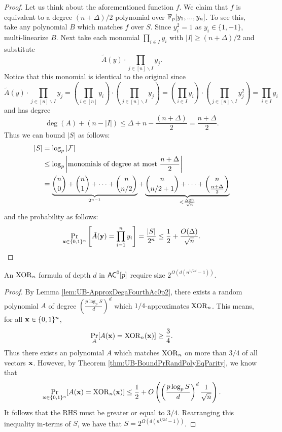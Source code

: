 \documentclass[11pt]{article}
\begin{document}
\begin{proof}
		Let us think about the aforementioned function $f$. We claim that $f$ is equivalent to a degree $(n + \Delta)/2$ polynomial over $\mathbb{F}_p[y_1, ..., y_n]$. To see this, take any polynomial $B$ which matches $f$ over $S$. Since $y_i^2 = 1$ as $y_i \in \{1, -1\}$, multi-linearize $B$. Next take each monomial $\prod_{i \in I}y_i$ with $|I| \geq (n + \Delta)/2$ and substitute 
		\[\tilde{A}(y) \cdot \prod_{j \in [n]\backslash I}y_j.\]
		Notice that this monomial is identical to the original since
		\[\tilde{A}(y) \cdot \prod_{j \in [n]\backslash I}y_j = \left(\prod_{i \in [n]} y_i\right) \cdot \left(\prod_{j \in [n]\backslash I}y_j\right) = \left(\prod_{i \in I}y_i\right)\cdot \left(\prod_{j \in [n]\backslash I}y_j^2\right) = \prod_{i \in I}y_i\]
		and has degree
		\[\deg(A) + (n - |I|) \leq \Delta + n - \frac{(n + \Delta)}{2} = \frac{n + \Delta}{2}.\] 
		Thus we can bound $|S|$ as follows:
		\begin{align*}
			|S| &= \log_{p}|\mathcal{F}|\\
				&\leq \log_{p}\left|\mbox{monomials of degree at most }\frac{n + \Delta}{2}\right|\\
				&= \underbrace{\binom{n}{0} + \binom{n}{1} + \cdots + \binom{n}{n/2}}_{2^{n-1}} + \underbrace{\binom{n}{n/2 + 1} + \cdots + \binom{n}{\frac{n + \Delta}{2}}}_{< \frac{\Delta 2^{n}}{\sqrt{n}}} 
		\end{align*}
		and the probability as follows:
		\[\Pr_{\mathbf{x} \in \{0,1\}^n}\left[\tilde{A}(\mathbf{y}) = \prod_{i = 1}^{n}y_i\right] = \frac{|S|}{2^n} \leq \frac{1}{2} + \frac{O(\Delta)}{\sqrt{n}}.\]
	\end{proof}

	\begin{theorem}
		\label{thm:UB-ParityinAc0p}
		An $\mathrm{XOR}_n$ formula of depth $d$ in $\mathsf{AC}^0[p]$ require size $2^{\Omega(d(n^{1/2d} - 1))}$. 
	\end{theorem}
	\begin{proof}
		By Lemma \ref{lem:UB-ApproxDegaFourthAc0p2}, there exists a random polynomial $A$ of degree $\left(\frac{p\log_p S}{d}\right)^d$ which $1/4$-approximates $\mathrm{XOR}_n$. This means, for all $\mathbf{x} \in \{0,1\}^n$, 
		\[\Pr_{A}[A(\mathbf{x}) = \mathrm{XOR}_n(\mathbf{x})] \geq \frac{3}{4}.\]
		Thus there exists an polynomial $A$ which matches $\mathrm{XOR}_n$ on more than $3/4$ of all vectors $\mathbf{x}$. However, by Theorem \ref{thm:UB-BoundPrRandPolyEqParity}, we know that 
		\[\Pr_{\mathbf{x} \in \{0,1\}^n}[A(\mathbf{x}) = \mathrm{XOR}_n(\mathbf{x})] \leq \frac{1}{2} + O\left(\left(\frac{p\log_p S}{d}\right)^d\frac{1}{\sqrt{n}}\right).\]
		It follows that the RHS must be greater or equal to $3/4$. Rearranging this inequality in-terms of $S$, we have that $S = 2^{\Omega(d(n^{1/2d} - 1))}$.	
	\end{proof}
\end{document}
